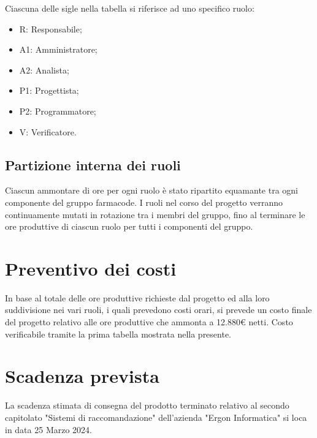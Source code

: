         Ciascuna delle sigle nella tabella si riferisce ad uno specifico ruolo:
        \begin{itemize}
            \item R: Responsabile;
            \item A1: Amministratore;
            \item A2: Analista;
            \item P1: Progettista;
            \item P2: Programmatore;
            \item V: Verificatore.
        \end{itemize}
    
    \subsection{Partizione interna dei ruoli}
    Ciascun ammontare di ore per ogni ruolo è stato ripartito equamante tra ogni componente del gruppo farmacode. I ruoli nel corso del progetto verranno continuamente mutati in rotazione tra i membri del gruppo, fino al terminare le ore produttive di ciascun ruolo per tutti i componenti del gruppo.

\section{Preventivo dei costi}
    In base al totale delle ore produttive richieste dal progetto ed alla loro suddivisione nei vari ruoli, i quali prevedono costi orari, si prevede un costo finale del progetto relativo alle ore produttive che ammonta a 12.880€ netti. Costo verificabile tramite la prima tabella mostrata nella presente.

\section{Scadenza prevista}
    La scadenza stimata di consegna del prodotto terminato relativo al secondo capitolato "Sistemi di raccomandazione" dell'azienda "Ergon Informatica" si loca in data 25 Marzo 2024.




